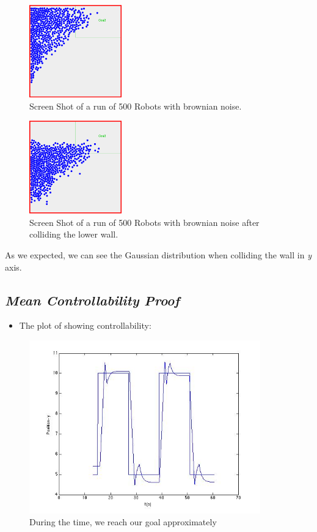\begin{figure}[h]
\begin{center}
\includegraphics[width=4cm]{fig/500RobotBrown3}
\caption{Screen Shot of a run of 500 Robots with brownian noise.}
\end{center}
\end{figure}
\begin{figure}[h]
\begin{center}
\includegraphics[width=4cm]{fig/500RobotBrown2}
\caption{Screen Shot of a run of 500 Robots with brownian noise after colliding the lower wall.}
\end{center}
\end{figure}
As we expected, we can see the Gaussian distribution when colliding the wall in \emph{y} axis.

\subsection{\emph{Mean Controllability Proof}}
\begin{itemize}
\item The plot of showing controllability:

\end{itemize}
\begin{figure}[h]
\begin{center}
\includegraphics[width=10cm]{fig/PlotPosition}
\caption{During the time, we reach our goal approximately}
\end{center}
\end{figure}




